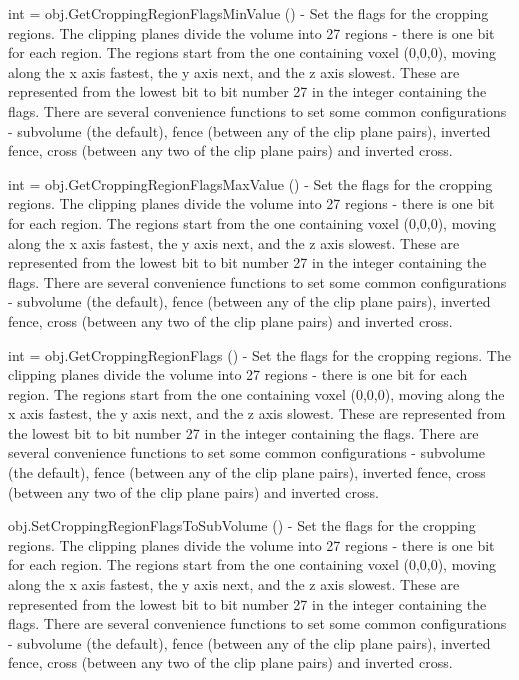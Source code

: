 \begin{DoxyItemize}
\item {\ttfamily int = obj.\-Get\-Cropping\-Region\-Flags\-Min\-Value ()} -\/ Set the flags for the cropping regions. The clipping planes divide the volume into 27 regions -\/ there is one bit for each region. The regions start from the one containing voxel (0,0,0), moving along the x axis fastest, the y axis next, and the z axis slowest. These are represented from the lowest bit to bit number 27 in the integer containing the flags. There are several convenience functions to set some common configurations -\/ subvolume (the default), fence (between any of the clip plane pairs), inverted fence, cross (between any two of the clip plane pairs) and inverted cross.  
\item {\ttfamily int = obj.\-Get\-Cropping\-Region\-Flags\-Max\-Value ()} -\/ Set the flags for the cropping regions. The clipping planes divide the volume into 27 regions -\/ there is one bit for each region. The regions start from the one containing voxel (0,0,0), moving along the x axis fastest, the y axis next, and the z axis slowest. These are represented from the lowest bit to bit number 27 in the integer containing the flags. There are several convenience functions to set some common configurations -\/ subvolume (the default), fence (between any of the clip plane pairs), inverted fence, cross (between any two of the clip plane pairs) and inverted cross.  
\item {\ttfamily int = obj.\-Get\-Cropping\-Region\-Flags ()} -\/ Set the flags for the cropping regions. The clipping planes divide the volume into 27 regions -\/ there is one bit for each region. The regions start from the one containing voxel (0,0,0), moving along the x axis fastest, the y axis next, and the z axis slowest. These are represented from the lowest bit to bit number 27 in the integer containing the flags. There are several convenience functions to set some common configurations -\/ subvolume (the default), fence (between any of the clip plane pairs), inverted fence, cross (between any two of the clip plane pairs) and inverted cross.  
\item {\ttfamily obj.\-Set\-Cropping\-Region\-Flags\-To\-Sub\-Volume ()} -\/ Set the flags for the cropping regions. The clipping planes divide the volume into 27 regions -\/ there is one bit for each region. The regions start from the one containing voxel (0,0,0), moving along the x axis fastest, the y axis next, and the z axis slowest. These are represented from the lowest bit to bit number 27 in the integer containing the flags. There are several convenience functions to set some common configurations -\/ subvolume (the default), fence (between any of the clip plane pairs), inverted fence, cross (between any two of the clip plane pairs) and inverted cross.  

\end{DoxyItemize}
